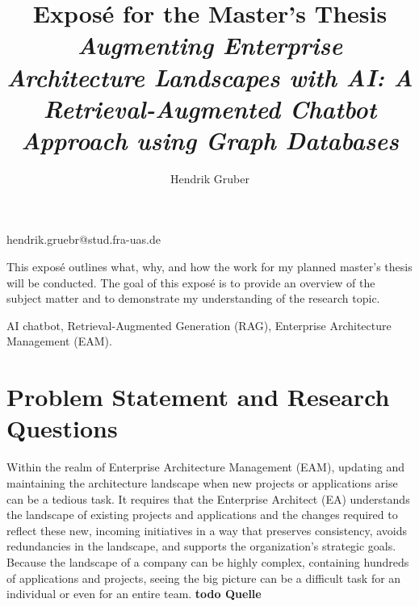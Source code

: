\documentclass[english]{lni}
\begin{document}
\title[Ein Kurztitel]{Exposé for the Master's Thesis \textit{Augmenting Enterprise Architecture Landscapes with AI: A Retrieval-Augmented Chatbot Approach using Graph Databases}}
 \author[1]{Hendrik Gruber}{hendrik.gruebr@stud.fra-uas.de}{}
\maketitle



This exposé outlines what, why, and how the work for my planned master's thesis will be conducted. The goal of this exposé is to provide an overview of the subject matter and to demonstrate my understanding of the research topic.

\begin{keywords}
AI chatbot, Retrieval-Augmented Generation (RAG), Enterprise Architecture Management (EAM).
\end{keywords}


\section{Problem Statement and Research Questions}
Within the realm of Enterprise Architecture Management (EAM), updating and maintaining the architecture landscape when new projects or applications arise can be a tedious task. It requires that the Enterprise Architect (EA) understands the landscape of existing projects and applications and the changes required to reflect these new, incoming initiatives in a way that preserves consistency, avoids redundancies in the landscape, and supports the organization's strategic goals. Because the landscape of a company can be highly complex, containing hundreds of applications and projects, seeing the big picture can be a difficult task for an individual or even for an entire team. \textbf{todo Quelle}
\end{document}
